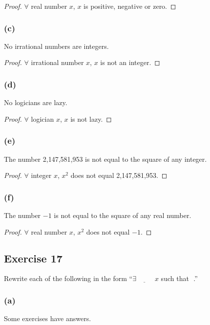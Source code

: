 \documentclass[14pt]{extarticle}
\newcommand{\fbl}{\underline{\hspace{1cm}}\,\,}
\newcommand{\fa}{\forall}
\newcommand{\te}{\exists}
\begin{document}
\begin{proof}
$\fa$ real number $x$, $x$ is positive, negative or zero.
\end{proof}

\subsubsection{(c)}
No irrational numbers are integers.

\begin{proof}
$\fa$ irrational number $x$, $x$ is not an integer.
\end{proof}

\subsubsection{(d)}
No logicians are lazy.

\begin{proof}
$\fa$ logician $x$, $x$ is not lazy.
\end{proof}

\subsubsection{(e)}
The number 2,147,581,953 is not equal to the square of any integer.

\begin{proof}
$\fa$ integer $x$, $x^2$ does not equal 2,147,581,953.
\end{proof}

\subsubsection{(f)}
The number $-1$ is not equal to the square of any real number.

\begin{proof}
$\fa$ real number $x$, $x^2$ does not equal $-1$.
\end{proof}

\subsection{Exercise 17}
Rewrite each of the following in the form “$\te \fbl x$ such that \fbl.”

\subsubsection{(a)}
Some exercises have answers.
\end{document}
